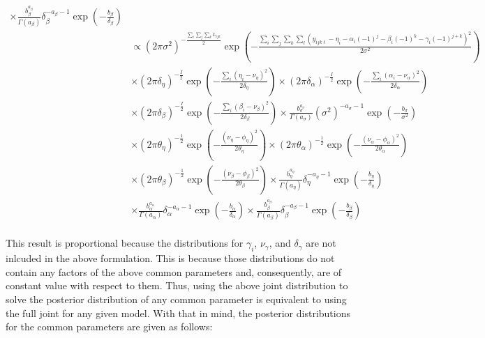 \begin{eqnarray*}
{\times\frac{b_{\beta}^{a_{\beta}}}{\Gamma\left(a_{\beta}\right)}\delta_{\beta}^{-a_{\beta}-1}\exp\left(-\frac{b_{\beta}}{\delta_{\beta}}\right)}&\\
&\displaystyle{\propto\left(2\pi\sigma^2\right)^{-\frac{\sum_i\sum_j\sum_kL_{ijk}}{2}}\exp\left(-\frac{\sum_i\sum_j\sum_k\sum_l\left(y_{ijk\ell}-\eta_i-\alpha_i\left(-1\right)^{j}-\beta_i\left(-1\right)^{k}-\gamma_i\left(-1\right)^{j+k}\right)^2}{2\sigma^2}\right)}&\\
&\displaystyle{\times\left(2\pi\delta_{\eta}\right)^{-\frac{I}{2}}\exp\left(-\frac{\sum_i\left(\eta_i-\nu_{\eta}\right)^2}{2\delta_{\eta}}\right)
\times\left(2\pi\delta_{\alpha}\right)^{-\frac{I}{2}}\exp\left(-\frac{\sum_i\left(\alpha_i-\nu_{\alpha}\right)^2}{2\delta_{\alpha}}\right)}&\\
&\displaystyle{\times\left(2\pi\delta_{\beta}\right)^{-\frac{I}{2}}\exp\left(-\frac{\sum_i\left(\beta_i-\nu_{\beta}\right)^2}{2\delta_{\beta}}\right)
\times\frac{b_{\sigma}^{a_{\sigma}}}{\Gamma(a_{\sigma})}\left(\sigma^2\right)^{-a_{\sigma}-1}\exp\left(-\frac{b_{\sigma}}{\sigma^2}\right)}&\\
&\displaystyle{\times\left(2\pi\theta_{\eta}\right)^{-\frac{1}{2}}\exp\left(-\frac{\left(\nu_{\eta}-\phi_{\eta}\right)^2}{2\theta_{\eta}}\right)
\times\left(2\pi\theta_{\alpha}\right)^{-\frac{1}{2}}\exp\left(-\frac{\left(\nu_{\alpha}-\phi_{\alpha}\right)^2}{2\theta_{\alpha}}\right)}&\\
&\displaystyle{\times\left(2\pi\theta_{\beta}\right)^{-\frac{1}{2}}\exp\left(-\frac{\left(\nu_{\beta}-\phi_{\beta}\right)^2}{2\theta_{\beta}}\right)
\times\frac{b_{\eta}^{a_{\eta}}}{\Gamma(a_{\eta})}\delta_{\eta}^{-a_{\eta}-1}\exp\left(-\frac{b_{\eta}}{\delta_{\eta}}\right)}&\\
&\displaystyle{\times\frac{b_{\alpha}^{a_{\alpha}}}{\Gamma(a_{\alpha})}\delta_{\alpha}^{-a_{\alpha}-1}\exp\left(-\frac{b_{\alpha}}{\delta_{\alpha}}\right)
\times\frac{b_{\beta}^{a_{\beta}}}{\Gamma(a_{\beta})}\delta_{\beta}^{-a_{\beta}-1}\exp\left(-\frac{b_{\beta}}{\delta_{\beta}}\right)}&\\
\end{eqnarray*}

This result is proportional because the distributions for $\gamma_i$,
$\nu_{\gamma}$, and $\delta_{\gamma}$ are not inlcuded in the above
formulation.  This is because those distributions do not contain any
factors of the above common parameters and, consequently, are of
constant value with respect to them.  Thus, using the above joint
distribution to solve the posterior distribution of any common
parameter is equivalent to using the full joint for any given model.
With that in mind, the posterior distributions for the common
parameters are given as follows:

